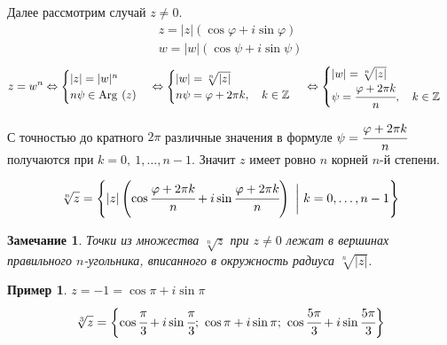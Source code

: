 \documentclass[a4paper,12pt]{article}
\newtheorem*{Examples}{Пример}
\newtheorem*{Comment}{Замечание}
\renewcommand{\Re}{\mathrm{Re\:}}
\renewcommand{\Im}{\mathrm{Im\:}}
\newcommand{\Arg}{\mathrm{Arg\:}}
\begin{document}
Далее рассмотрим случай $z \neq 0$. 
\begin{gather*}
z = |z|\left(\cos\varphi+i\sin\varphi\right)\\
w = |w|\left(\cos\psi+i\sin\psi\right)
\end{gather*}
\[
z = w^n \Leftrightarrow
\begin{cases}
|z| = |w|^n \\
n\psi\in\Arg\left(z\right)
\end{cases}
\Leftrightarrow
\begin{cases}
|w|= \sqrt[n]{|z|}\\
n\psi= \varphi+2\pi k,\quad k\in \mathbb Z
\end{cases}\\
\Leftrightarrow
\begin{cases}
|w|=\sqrt[n]{|z|}\\
\psi = \cfrac{\varphi+2\pi k}{n},\quad k \in \mathbb{Z}
\end{cases}
\]

С точностью до кратного $2\pi$ различные значения в формуле $\psi = \cfrac{\varphi+2\pi k }{n}$ получаются при $k = 0,\ 1,\ldots,n-1$. Значит $z$ имеет ровно $n$ корней $n$-й степени. 

\[ \sqrt[n]{z} = \Biggl\{|z|\left(\cos\cfrac{\varphi+2\pi k}{n}+i\sin\cfrac{\varphi+2\pi k }{n}\right)\ \biggl|\ k=0,\ldots,n-1\Biggr\}
\]

\begin{Comment}
Точки из множества $\sqrt[n]{z}$ при $z\neq 0$ лежат в вершинах правильного $n$-угольника, вписанного в окружность радиуса $\sqrt[n]{|z|}$. 
\end{Comment}

\begin{Examples} $z=-1=\cos\pi+i\sin\pi $
$$\sqrt[3]{z} = \biggl\{ \cos\cfrac\pi3+i\sin\cfrac\pi3;\ \cos\pi+i\sin\pi;\ \cos\cfrac{5\pi}{3}+i\sin\cfrac{5\pi}{3} \biggl\}
$$
\begin{center}
\end{center}

\end{Examples}
\end{document}
